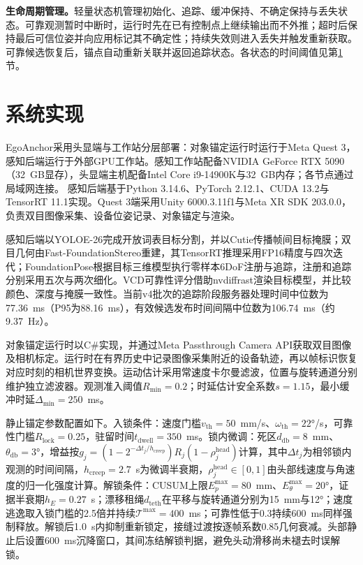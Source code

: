 \documentclass[review]{vgtc}
\begin{document}
\textbf{生命周期管理。}轻量状态机管理初始化、追踪、缓冲保持、不确定保持与丢失状态。可靠观测暂时中断时，运行时先在已有控制点上继续输出而不外推；超时后保持最后可信位姿并向应用标记其不确定性；持续失效则进入丢失并触发重新获取。可靠候选恢复后，锚点自动重新关联并返回追踪状态。各状态的时间阈值见第\ref{sec:implementation}节。


\section{系统实现}\label{sec:implementation}

EgoAnchor采用头显端与工作站分层部署：对象锚定运行时运行于Meta Quest 3，感知后端运行于外部GPU工作站。感知工作站配备NVIDIA GeForce RTX 5090（32~GB显存），头显端主机配备Intel Core i9-14900K与32~GB内存；各节点通过局域网连接。
感知后端基于Python 3.14.6、PyTorch 2.12.1、CUDA 13.2与TensorRT 11.1实现。Quest 3端采用Unity 6000.3.11f1与Meta XR SDK 203.0.0，负责双目图像采集、设备位姿记录、对象锚定与渲染。

感知后端以YOLOE-26完成开放词表目标分割，并以Cutie传播帧间目标掩膜；双目几何由Fast-FoundationStereo重建，其TensorRT推理采用FP16精度与四次迭代；FoundationPose根据目标三维模型执行零样本6DoF注册与追踪，注册和追踪分别采用五次与两次细化。VCD可靠性评分借助nvdiffrast渲染目标模型，并比较颜色、深度与掩膜一致性。当前v4批次的追踪阶段服务器处理时间中位数为77.36~ms（P95为88.16~ms），有效候选发布时间间隔中位数为106.74~ms（约9.37~Hz）。

对象锚定运行时以C\#实现，并通过Meta Passthrough Camera API获取双目图像及相机标定。运行时在有界历史中记录图像采集附近的设备轨迹，再以帧标识恢复对应时刻的相机世界变换。运动估计采用常速度卡尔曼滤波，位置与旋转通道分别维护独立滤波器。观测准入阈值$R_{\min} = 0.2$；时延估计安全系数$s = 1.15$，最小缓冲时延$\Delta_{\min} = 250$~ms。

静止锚定参数配置如下。入锁条件：速度门槛$v_{\mathrm{th}} = 50$~mm/s、$\omega_{\mathrm{th}} = 22$°/s，可靠性门槛$R_{\mathrm{lock}} = 0.25$，驻留时间$t_{\mathrm{dwell}} = 350$~ms。锁内微调：死区$d_{\mathrm{db}} = 8$~mm、$\theta_{\mathrm{db}} = 3$°，增益按$g_j = (1 - 2^{-\Delta t_j / h_{\mathrm{creep}}}) R_j (1 - \rho_j^{\mathrm{head}})$计算，其中$\Delta t_j$为相邻锁内观测的时间间隔，$h_{\mathrm{creep}} = 2.7$~s为微调半衰期，$\rho_j^{\mathrm{head}} \in [0,1]$由头部线速度与角速度的归一化强度计算。解锁条件：CUSUM上限$E_p^{\max} = 80$~mm、$E_\theta^{\max} = 20$°，证据半衰期$h_E = 0.27$~s；漂移租绳$d_{\mathrm{teth}}$在平移与旋转通道分别为15~mm与12°；速度逃逸取入锁门槛的2.5倍并持续$\mathcal{T}^{\max} = 400$~ms；可靠性低于0.3持续600~ms同样强制释放。解锁后1.0~s内抑制重新锁定，接缝过渡按逐帧系数0.85几何衰减。头部静止后设置600~ms沉降窗口，其间冻结解锁判据，避免头动滑移尚未褪去时误解锁。
\end{document}
